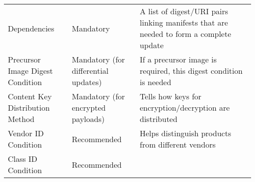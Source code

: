 \begin{longtable}[]{@{}lll@{}}
\begin{minipage}[t]{0.23\columnwidth}
Dependencies\strut
\end{minipage} & \begin{minipage}[t]{0.26\columnwidth}\raggedright\strut
Mandatory\strut
\end{minipage} & \begin{minipage}[t]{0.42\columnwidth}\raggedright\strut
A list of digest/URI pairs linking manifests that are needed to form a
complete update\strut
\end{minipage}\tabularnewline
\begin{minipage}[t]{0.23\columnwidth}\raggedright\strut
Precursor Image Digest Condition\strut
\end{minipage} & \begin{minipage}[t]{0.26\columnwidth}\raggedright\strut
Mandatory (for differential updates)\strut
\end{minipage} & \begin{minipage}[t]{0.42\columnwidth}\raggedright\strut
If a precursor image is required, this digest condition is needed\strut
\end{minipage}\tabularnewline
\begin{minipage}[t]{0.23\columnwidth}\raggedright\strut
Content Key Distribution Method\strut
\end{minipage} & \begin{minipage}[t]{0.26\columnwidth}\raggedright\strut
Mandatory (for encrypted payloads)\strut
\end{minipage} & \begin{minipage}[t]{0.42\columnwidth}\raggedright\strut
Tells how keys for encryption/decryption are distributed\strut
\end{minipage}\tabularnewline
\begin{minipage}[t]{0.23\columnwidth}\raggedright\strut
Vendor ID Condition\strut
\end{minipage} & \begin{minipage}[t]{0.26\columnwidth}\raggedright\strut
Recommended\strut
\end{minipage} & \begin{minipage}[t]{0.42\columnwidth}\raggedright\strut
Helps distinguish products from different vendors\strut
\end{minipage}\tabularnewline
\begin{minipage}[t]{0.23\columnwidth}\raggedright\strut
Class ID Condition\strut
\end{minipage} & \begin{minipage}[t]{0.26\columnwidth}\raggedright\strut
Recommended\strut

\end{minipage}
\end{longtable}
